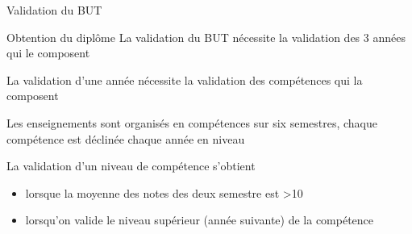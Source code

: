 \documentclass [xcolor=x11names,t] {beamer}
\begin{document}
\begin{frame}{Validation du BUT}
	\begin{block}{Obtention du diplôme}
	La validation du BUT nécessite la validation des 3 années qui le composent

	La validation d’une année nécessite la validation des compétences qui la composent

	Les enseignements sont organisés en compétences sur six semestres, chaque compétence est déclinée chaque année en niveau 

	La validation d’un niveau de compétence s’obtient
	\begin{itemize}
		\item lorsque la moyenne des notes des deux semestre est >10
		\item lorsqu’on valide le niveau supérieur (année suivante) de la compétence
	\end{itemize} 
		
	\end{block}

\end{frame}
\end{document}
